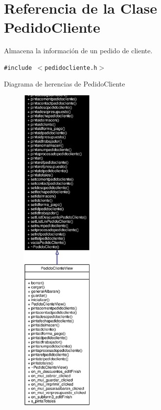\section{Referencia de la Clase Pedido\-Cliente}
\label{classPedidoCliente}
Almacena la informaci\'{o}n de un pedido de cliente.  


{\tt \#include $<$pedidocliente.h$>$}

Diagrama de herencias de Pedido\-Cliente\begin{figure}[H]
\begin{center}
\leavevmode
\includegraphics[width=103pt]{classPedidoCliente__inherit__graph}
\end{center}
\end{figure}

